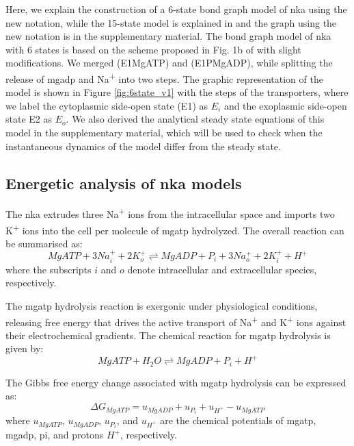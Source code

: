 \documentclass{biophys-new}
\begin{document}
Here, we explain the construction of a 6-state bond graph model of \Gls{nka} using the new notation,
while the 15-state model is explained in \cite{pan_cardiac_2020} and the graph using the new notation is in the supplementary material.
The bond graph model of \Gls{nka} with 6 states is based on the scheme proposed in Fig. 1b of \cite{nguyen_structural_2022} with slight modifications.
We merged (\textrm{E1\textperiodcentered [3Na]\textperiodcentered MgATP}) and (\textrm{E1\textperiodcentered [3Na]\textperiodcentered P\text{-}MgADP}), 
while splitting the release of \gls{mgadp} and Na\textsuperscript{+} into two steps. The graphic representation of the model is shown in Figure \ref{fig:6state_v1} with the steps of the transporters, where we label the cytoplasmic side-open state (\textrm{E1}) as $E_i$ and the exoplasmic side-open state \textrm{E2} as $E_o$. We also derived the analytical steady state equations of this model in the supplementary material, which will be used to check when the instantaneous dynamics of the model differ from the steady state.
\subsection*{Energetic analysis of \gls{nka} models}
The \gls{nka} extrudes three Na\textsuperscript{+} ions from the intracellular space and imports two K\textsuperscript{+} ions into the cell per molecule of \gls{mgatp} hydrolyzed. The overall reaction can be summarised as:
\begin{equation}
      \label{eq:nka_reaction}
      MgATP + 3Na^+_i + 2K^+_o \rightleftharpoons  MgADP + P_i + 3Na^+_o + 2K^+_i + H^+
\end{equation}
where the subscripts $i$ and $o$ denote intracellular and extracellular species, respectively.

The \gls{mgatp} hydrolysis reaction is exergonic under physiological conditions, releasing free energy that drives the active transport of Na\textsuperscript{+} and K\textsuperscript{+} ions against their electrochemical gradients. The chemical reaction for \gls{mgatp} hydrolysis is given by:
\begin{equation}
      \label{eq:atp_hydrolysis_reaction}
      MgATP + H_2O \rightleftharpoons  MgADP + P_i + H^+
\end{equation}

The Gibbs free energy change associated with \gls{mgatp} hydrolysis can be expressed as:
\begin{equation}
      \label{eq:atp_hydrolysis}
      \Delta G_{MgATP} =  u_{MgADP} + u_{P_i} + u_{H^+} - u_{MgATP}
\end{equation}
where $u_{MgATP}$, $u_{MgADP}$, $u_{P_i}$, and $u_{H^+}$ are the chemical potentials of \gls{mgatp}, \gls{mgadp}, \gls{pi}, and protons $H^+$, respectively.
\end{document}
